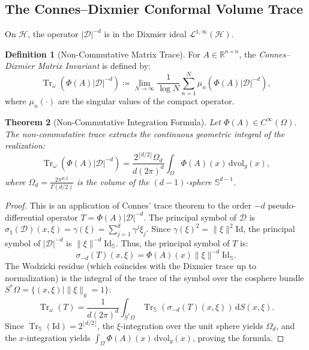 \documentclass[11pt,a4paper,reqno]{amsart}
\newtheorem{theorem}{Theorem}[section]
\theoremstyle{definition}
\newtheorem{definition}[theorem]{Definition}
\numberwithin{equation}{section}
\newcommand{\R}{\mathbb{R}}
\newcommand{\Id}{\mathrm{Id}}
\newcommand{\Tr}{\operatorname{Tr}}
\newcommand{\dif}{\,\mathrm{d}}
\begin{document}
\subsection{The Connes--Dixmier Conformal Volume Trace}
On $\mathcal{H}$, the operator $|\mathcal{D}|^{-d}$ is in the Dixmier ideal $\mathcal{L}^{1,\infty}(\mathcal{H})$.

\begin{definition}[Non-Commutative Matrix Trace]
For $A \in \R^{n \times n}$, the \emph{Connes--Dixmier Matrix Invariant} is defined by:
\begin{equation}
    \Tr_\omega \left( \Phi(A) |\mathcal{D}|^{-d} \right) \coloneqq \lim_{N \to \infty} \frac{1}{\log N} \sum_{n=1}^N \mu_n \left( \Phi(A) |\mathcal{D}|^{-d} \right),
\end{equation}
where $\mu_n(\cdot)$ are the singular values of the compact operator.
\end{definition}

\begin{theorem}[Non-Commutative Integration Formula]
\label{thm:dixmier_integration}
Let $\Phi(A) \in C^\infty(\Omega)$. The non-commutative trace extracts the continuous geometric integral of the realization:
\begin{equation}
    \Tr_\omega \left( \Phi(A) |\mathcal{D}|^{-d} \right) = \frac{2^{\lfloor d/2 \rfloor} \Omega_d}{d (2\pi)^d} \int_\Omega \Phi(A)(x) \dif \mathrm{vol}_g(x),
\end{equation}
where $\Omega_d = \frac{2 \pi^{d/2}}{\Gamma(d/2)}$ is the volume of the $(d-1)$-sphere $\mathbb{S}^{d-1}$.
\end{theorem}

\begin{proof}
This is an application of Connes' trace theorem \cite{connes1994noncommutative} to the order $-d$ pseudo-differential operator $T = \Phi(A) |\mathcal{D}|^{-d}$. 
The principal symbol of $\mathcal{D}$ is $\sigma_1(\mathcal{D})(x, \xi) = \gamma(\xi) = \sum_{j=1}^d \gamma^j \xi_j$. 
Since $\gamma(\xi)^2 = \|\xi\|^2 \Id$, the principal symbol of $|\mathcal{D}|^{-d}$ is $\|\xi\|^{-d} \Id_{\mathbb{S}}$. 
Thus, the principal symbol of $T$ is:
\begin{equation}
    \sigma_{-d}(T)(x, \xi) = \Phi(A)(x) \|\xi\|^{-d} \Id_{\mathbb{S}}.
\end{equation}
The Wodzicki residue (which coincides with the Dixmier trace up to normalization) is the integral of the trace of the symbol over the cosphere bundle $S^*\Omega = \{(x, \xi) \mid \|\xi\|_g = 1\}$:
\begin{equation}
    \Tr_\omega(T) = \frac{1}{d (2\pi)^d} \int_{S^*\Omega} \Tr_{\mathbb{S}} \left( \sigma_{-d}(T)(x, \xi) \right) \dif S(x, \xi).
\end{equation}
Since $\Tr_{\mathbb{S}}(\Id) = 2^{\lfloor d/2 \rfloor}$, the $\xi$-integration over the unit sphere yields $\Omega_d$, and the $x$-integration yields $\int_\Omega \Phi(A)(x) \dif \mathrm{vol}_g(x)$, proving the formula.
\end{proof}
\end{document}

